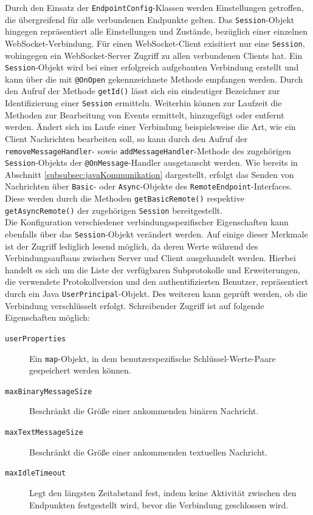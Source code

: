 \documentclass[11pt,a4paper,titlepage]{scrartcl}
\numberwithin{equation}{section}
\begin{document}
\noindent Durch den Einsatz der \texttt{EndpointConfig}-Klassen werden Einstellungen getroffen, die übergreifend für alle verbundenen Endpunkte gelten. Das \texttt{Session}-Objekt hingegen repräsentiert alle Einstellungen und Zustände, bezüglich einer einzelnen WebSocket-Verbindung. Für einen WebSocket-Client exisitiert nur eine \texttt{Session}, wohingegen ein WebSocket-Server Zugriff zu allen verbundenen Clients hat. Ein \texttt{Session}-Objekt wird bei einer erfolgreich aufgebauten Verbindung erstellt und kann über die mit \texttt{@OnOpen} gekennzeichnete Methode empfangen werden. Durch den Aufruf der Methode \texttt{getId()} lässt sich ein eindeutiger Bezeichner zur Identifizierung einer \texttt{Session} ermitteln. Weiterhin können zur Laufzeit die Methoden zur Bearbeitung von Events ermittelt, hinzugefügt oder entfernt werden. Ändert sich im Laufe einer Verbindung beispielsweise die Art, wie ein Client Nachrichten bearbeiten soll, so kann durch den Aufruf der \texttt{removeMessageHandler}- sowie \texttt{addMessageHandler}-Methode des zugehörigen \texttt{Session}-Objekts der \texttt{@OnMessage}-Handler ausgetauscht werden. Wie bereits in Abschnitt \ref{subsubsec:javaKommunikation} dargestellt, erfolgt das Senden von Nachrichten über \texttt{Basic}- oder \texttt{Async}-Objekte des \texttt{RemoteEndpoint}-Interfaces. Diese werden durch die Methoden \texttt{getBasicRemote()} respektive \texttt{getAsyncRemote()} der zugehörigen \texttt{Session} bereitgestellt. \\

\noindent Die Konfiguration verschiedener verbindungsspezifischer Eigenschaften kann ebenfalls über das \texttt{Session}-Objekt verändert werden. Auf einige dieser Merkmale ist der Zugriff lediglich lesend möglich, da deren Werte während des Verbindungsaufbaus zwischen Server und Client ausgehandelt werden. Hierbei handelt es sich um die Liste der verfügbaren Subprotokolle und Erweiterungen, die verwendete Protokollversion und den authentifizierten Benutzer, repräsentiert durch ein Java \texttt{UserPrincipal}-Objekt. Des weiteren kann geprüft werden, ob die Verbindung verschlüsselt erfolgt. Schreibender Zugriff ist auf folgende Eigenschaften möglich: 

\begin{description}
	\item[\texttt{userProperties}] Ein \texttt{map}-Objekt, in dem benutzerspezifische Schlüssel-Werte-Paare gespeichert werden können.
	\item[\texttt{maxBinaryMessageSize}] Beschränkt die Größe einer ankommenden binären Nachricht. 
	\item[\texttt{maxTextMessageSize}] Beschränkt die Größe einer ankommenden textuellen Nachricht. 
	\item[\texttt{maxIdleTimeout}] Legt den längsten Zeitabstand fest, indem keine Aktivität zwischen den Endpunkten festgestellt wird, bevor die Verbindung geschlossen wird.
\end{description}
\end{document}
